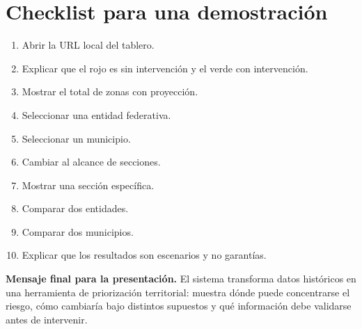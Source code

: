 \documentclass[11pt,a4paper]{article}
\begin{document}
\section{Checklist para una demostración}

\begin{enumerate}
    \item Abrir la URL local del tablero.
    \item Explicar que el rojo es sin intervención y el verde con intervención.
    \item Mostrar el total de zonas con proyección.
    \item Seleccionar una entidad federativa.
    \item Seleccionar un municipio.
    \item Cambiar al alcance de secciones.
    \item Mostrar una sección específica.
    \item Comparar dos entidades.
    \item Comparar dos municipios.
    \item Explicar que los resultados son escenarios y no garantías.
\end{enumerate}

\begin{resultado}
\textbf{Mensaje final para la presentación.} El sistema transforma datos históricos en una herramienta de priorización territorial: muestra dónde puede concentrarse el riesgo, cómo cambiaría bajo distintos supuestos y qué información debe validarse antes de intervenir.
\end{resultado}
\end{document}
